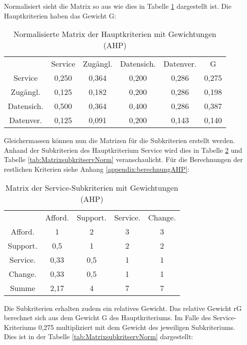 Normalisiert sieht die Matrix so aus wie dies in Tabelle \ref{tab:MatrixHauptkriterienGewicht} dargestellt ist. Die Hauptkriterien haben das Gewicht G: 
\begin{table}[h]
	\centering
\begin{tabular}{cccccc}
  & Service & Zugängl. & Datensich. & Datenver. & G \\
  Service & 0,250 & 0,364 & 0,200 & 0,286 & 0,275 \\
  Zugängl. & 0,125 & 0,182 & 0,200 & 0,286 & 0,198 \\
  Datensich. & 0,500 & 0,364 & 0,400 & 0,286 & 0,387 \\
  Datenver. & 0,125 & 0,091 & 0,200 & 0,143 & 0,140 \\
  \end{tabular} 
  \caption{Normalisierte Matrix der Hauptkriterien mit Gewichtungen (AHP)}
\label{tab:MatrixHauptkriterienGewicht}
\end{table}	

\newpage

Gleichermassen können nun die Matrizen für die Subkriterien erstellt werden. Anhand der Subkriterien des Hauptkriterium Service wird dies in Tabelle \ref{tab:Matrixsubkritserv} und Tabelle \ref{tab:MatrixsubkritservNorm} veranschaulicht. Für die Berechnungen der restlichen Kriterien siehe Anhang \ref{appendix:berechnungAHP}:

\begin{table}[h]
	\centering
\begin{tabular}{ccccc}
  & Afford. & Support. & Service. & Change. \\
  Afford. & 1 & 2 & 3 & 3 \\
  Support. & 0,5 & 1 & 2 & 2 \\
  Service. & 0,33 & 0,5 & 1 & 1 \\
  Change. & 0,33 & 0,5 & 1 & 1 \\
  Summe & 2,17 & 4 & 7 & 7 \\
\end{tabular} 
\caption{Matrix der Service-Subkriterien mit Gewichtungen (AHP)}
\label{tab:Matrixsubkritserv}
\end{table}

Die Subkriterien erhalten zudem ein relatives Gewicht. Das relative Gewicht rG berechnet sich aus dem Gewicht G des Hauptkriteriums. Im Falle des Service-Kriteriums 0,275 multipliziert mit dem Gewicht des jeweiligen Subkriteriums. Dies ist in der Tabelle \ref{tab:MatrixsubkritservNorm} dargestellt:

